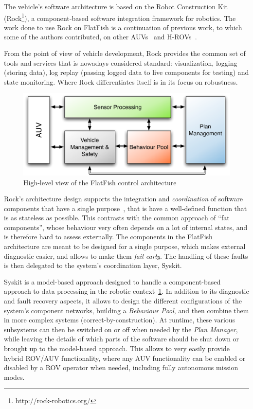 \documentclass[conference]{IEEEtran}
\begin{document}
The vehicle's software architecture is based on the Robot Construction Kit
(Rock\footnote{http://rock-robotics.org/}), a component-based software integration
framework for robotics. The work done to use Rock on FlatFish is a continuation of
previous work, to which some of the authors contributed, on other AUVs~\cite{albiez2010}
and H-ROVs~\cite{meinecke2013}.

From the point of view of vehicle development, Rock provides the common set of tools
and services that is nowadays considered standard: visualization, logging (storing data), 
log replay (passing logged data to live components for testing) and state monitoring.
Where Rock differentiates itself is in its focus on robustness.

\begin{figure}[!t]
	\centering
	\includegraphics[width=0.9\columnwidth]{sw_arch_overview}
	\caption{High-level view of the FlatFish control architecture}
	\label{fig:sw_arch}
\end{figure}

Rock's architecture design supports the integration and \emph{coordination} of software
components that have a single purpose~\cite{Joyeux2013}, that is have a well-defined 
function that is as
stateless as possible. This contrasts with the common approach of ``fat components'',
whose behaviour very often depends on a lot of internal states, and is therefore hard to
assess externally. The components in the FlatFish architecture are meant to be designed
for a single purpose, which makes external diagnostic easier, and allows to make them
\emph{fail early}. The handling of these faults is then delegated to the system's
coordination layer, Syskit\cite{Joyeux2011}.

Syskit is a model-based approach designed to handle a component-based approach to 
data
processing in the robotic context~\ref{fig:sw_arch}. In addition to its diagnostic and fault 
recovery
aspects, it allows to design the different configurations of the system's component
networks, building a \emph{Behaviour Pool}, and then combine them in more complex 
systems
(correct-by-construction). At runtime, these various subsystems can then be switched on or
off when needed by the \emph{Plan Manager}, while leaving the details of which parts of
the software should be shut down or brought up to the model-based approach. This allows 
to
very easily provide hybrid ROV/AUV functionality, where any AUV functionality can be enabled or disabled by a ROV operator when needed, including fully autonomous mission
modes.
\end{document}
